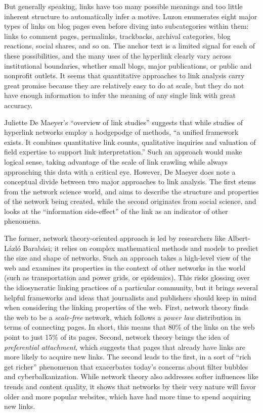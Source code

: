 But generally speaking, links have too many possible meanings and too little inherent structure to automatically infer a motive. Luzon enumerates eight major types of links on blog pages even before diving into subcategories within them: links to comment pages, permalinks, trackbacks, archival categories, blog reactions, social shares, and so on.\autocite[79]{luzon_scholarly_2009} The anchor text is a limited signal for each of these possibilities, and the many uses of the hyperlink clearly vary across institutional boundaries, whether small blogs, major publications, or public and nonprofit outlets. It seems that quantitative approaches to link analysis carry great promise because they are relatively easy to do at scale, but they do not have enough information to infer the meaning of any single link with great accuracy.

Juliette De Maeyer's ``overview of link studies'' suggests that while studies of hyperlink networks employ a hodgepodge of methods, ``a unified framework exists. It combines quantitative link counts, qualitative inquiries and valuation of field expertise to support link interpretation.''\autocite[737]{de_maeyer_towards_2013} Such an approach would make logical sense, taking advantage of the scale of link crawling while always approaching this data with a critical eye. However, De Maeyer does note a conceptual divide between two major approaches to link analysis. The first stems from the network science world, and aims to describe the structure and properties of the network being created, while the second originates from social science, and looks at the ``information side-effect'' of the link as an indicator of other phenomena.

The former, network theory-oriented approach is led by researchers like Albert-L\'{a}zl\'{o} Barab\'{a}si; it relies on complex mathematical methods and models to predict the size and shape of networks. Such an approach takes a high-level view of the web and examines its properties in the context of other networks in the world (such as transportation and power grids, or epidemics). This risks glossing over the idiosyncratic linking practices of a particular community, but it brings several helpful frameworks and ideas that journalists and publishers should keep in mind when considering the linking properties of the web. First, network theory finds the web to be a \emph{scale-free} network, which follows a \emph{power law} distribution in terms of connecting pages. In short, this means that 80\% of the links on the web point to just 15\% of its pages.\autocite[``The 80/20 Rule'']{barabasi_linked:_2003} Second, network theory brings the idea of \emph{preferential attachment}, which suggests that pages that already have links are more likely to acquire new links. The second leads to the first, in a sort of ``rich get richer'' phenomenon that exacerbates today's concerns about filter bubbles and cyberbalkanization. While network theory also addresses softer influences like trends and content quality, it shows that networks by their very nature will favor older and more popular websites, which have had more time to spend acquiring new links.

